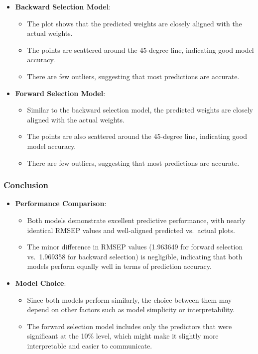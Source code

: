 \documentclass[
]{article}
\providecommand{\tightlist}{%
  \setlength{\itemsep}{0pt}\setlength{\parskip}{0pt}}
\begin{document}
\begin{itemize}
\tightlist
\item
  \textbf{Backward Selection Model}:

  \begin{itemize}
  \tightlist
  \item
    The plot shows that the predicted weights are closely aligned with
    the actual weights.
  \item
    The points are scattered around the 45-degree line, indicating good
    model accuracy.
  \item
    There are few outliers, suggesting that most predictions are
    accurate.
  \end{itemize}
\item
  \textbf{Forward Selection Model}:

  \begin{itemize}
  \tightlist
  \item
    Similar to the backward selection model, the predicted weights are
    closely aligned with the actual weights.
  \item
    The points are also scattered around the 45-degree line, indicating
    good model accuracy.
  \item
    There are few outliers, suggesting that most predictions are
    accurate.
  \end{itemize}
\end{itemize}

\hypertarget{conclusion-1}{%
\subsubsection{Conclusion}\label{conclusion-1}}

\begin{itemize}
\tightlist
\item
  \textbf{Performance Comparison}:

  \begin{itemize}
  \tightlist
  \item
    Both models demonstrate excellent predictive performance, with
    nearly identical RMSEP values and well-aligned predicted vs.~actual
    plots.
  \item
    The minor difference in RMSEP values (1.963649 for forward selection
    vs.~1.969358 for backward selection) is negligible, indicating that
    both models perform equally well in terms of prediction accuracy.
  \end{itemize}
\item
  \textbf{Model Choice}:

  \begin{itemize}
  \tightlist
  \item
    Since both models perform similarly, the choice between them may
    depend on other factors such as model simplicity or
    interpretability.
  \item
    The forward selection model includes only the predictors that were
    significant at the 10\% level, which might make it slightly more
    interpretable and easier to communicate.
  \end{itemize}
\end{itemize}
\end{document}
